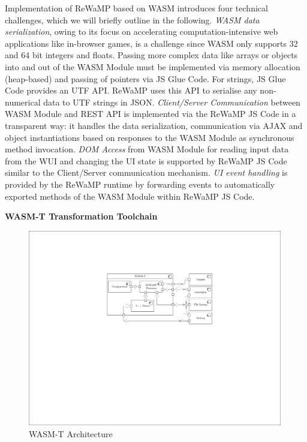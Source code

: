 Implementation of ReWaMP based on WASM introduces four technical challenges, which we will briefly outline in the following.
\emph{WASM data serialization}, owing to its focus on accelerating computation-intensive web applications like in-browser games, is a challenge since WASM only supports 32 and 64 bit integers and floats.
Passing more complex data like arrays or objects into and out of the WASM Module must be implemented via memory allocation (heap-based) and passing of pointers via JS Glue Code.
For strings, JS Glue Code provides an UTF API.
ReWaMP uses this API to serialise any non-numerical data to UTF strings in JSON.
\emph{Client/Server Communication} between WASM Module and REST API is implemented via the ReWaMP JS Code in a transparent way: it handles the data serialization, communication via AJAX and object instantiations based on responses to the WASM Module as synchronous method invocation.
\emph{DOM Access} from WASM Module for reading input data from the WUI and changing the UI state is supported by ReWaMP JS Code similar to the Client/Server communication mechanism.
\emph{UI event handling} is provided by the ReWaMP runtime by forwarding events to automatically exported methods of the WASM Module within ReWaMP JS Code.

\textbf{WASM-T Transformation Toolchain}

\begin{figure}
\hypertarget{fig:awsm.rm.wasmt.architecture}{%
\centering
\includegraphics[width=0.99\textwidth]{../figures/awsm-rm-wasmt-architecture.pdf}
\caption{WASM-T Architecture}\label{fig:awsm.rm.wasmt.architecture}
}
\end{figure}

